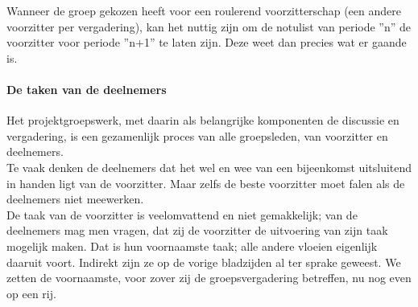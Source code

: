 Wanneer de groep gekozen heeft voor een roulerend voorzitterschap
(een andere voorzitter per vergadering),
kan het nuttig zijn om de notulist van periode ''n'' de
voorzitter voor periode ''n+1'' te laten zijn. Deze weet dan
precies wat er gaande is.

\paragraph{De taken van de deelnemers}

Het projektgroepswerk, met daarin als belangrijke komponenten
de discussie en vergadering, is een gezamenlijk proces van
alle groepsleden, van voorzitter en deelnemers.\\
Te vaak denken de deelnemers dat het wel en wee van een bijeenkomst uitsluitend in handen ligt van de voorzitter. Maar
zelfs de beste voorzitter moet falen als de deelnemers niet
meewerken.\\
De taak van de voorzitter is veelomvattend en niet gemakkelijk; van de deelnemers mag men vragen, dat zij de voorzitter
de uitvoering van zijn taak mogelijk maken. Dat is hun voornaamste taak; alle andere vloeien eigenlijk daaruit voort.
Indirekt zijn ze op de vorige bladzijden al ter sprake geweest. We zetten de voornaamste, voor zover zij de groepsvergadering betreffen, nu nog even op een rij.
